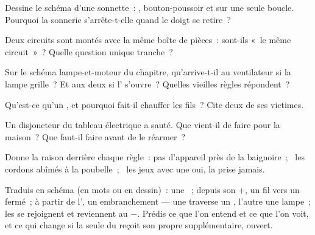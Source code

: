 \begin{exercise}[$\star$]\label{exo:g6:circuits-and-safety:3}
Dessine le schéma d'une sonnette~: , bouton-poussoir et 
sur une seule boucle. Pourquoi la sonnerie s'arrête-t-elle quand le
doigt se retire~?
\end{exercise}

\begin{exercise}[$\star$]\label{exo:g6:circuits-and-safety:4}
Deux circuits sont montés avec la même boîte de pièces~: sont-ils
«~le même circuit~»~? Quelle question unique tranche~?
\end{exercise}

\begin{exercise}[$\star$]\label{exo:g6:circuits-and-safety:5}
Sur le schéma lampe-et-moteur du chapitre, qu'arrive-t-il au
ventilateur si la lampe grille~? Et aux deux si l'
s'ouvre~? Quelles vieilles règles répondent~?
\end{exercise}

\begin{exercise}[$\star$]\label{exo:g6:circuits-and-safety:6}
Qu'est-ce qu'un , et pourquoi fait-il chauffer les
fils~? Cite deux de ses victimes.
\end{exercise}

\begin{exercise}[$\star$]\label{exo:g6:circuits-and-safety:7}
Un disjoncteur du tableau électrique a sauté. Que vient-il de faire
pour la maison~? Que faut-il faire avant de le réarmer~?
\end{exercise}

\begin{exercise}[$\star$]\label{exo:g6:circuits-and-safety:8}
Donne la raison derrière chaque règle~: pas d'appareil près de la
baignoire~; \ les cordons abîmés à la poubelle~; \ les jeux avec une
 oui, la prise jamais.
\end{exercise}

\begin{exercise}[$\star\star$]\label{exo:g6:circuits-and-safety:9}
Traduis en schéma (en mots ou en dessin)~: une ~; depuis son $+$,
un fil vers un  fermé~; à partir de l', un
embranchement --- une  traverse un , l'autre une
lampe~; les  se rejoignent et reviennent au $-$. Prédis ce
que l'on entend et ce que l'on voit, et ce qui change si la seule
 du  reçoit son propre  supplémentaire,
ouvert.
\end{exercise}

